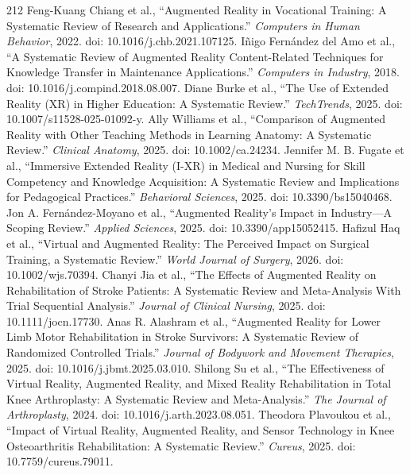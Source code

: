 \begin{thebibliography}{212}
 Feng-Kuang Chiang et al., ``Augmented Reality in Vocational Training: A Systematic Review of Research and Applications.'' \emph{Computers in Human Behavior}, 2022. doi: 10.1016/j.chb.2021.107125.
 I{\~n}igo Fern{\'a}ndez del Amo et al., ``A Systematic Review of Augmented Reality Content-Related Techniques for Knowledge Transfer in Maintenance Applications.'' \emph{Computers in Industry}, 2018. doi: 10.1016/j.compind.2018.08.007.
 Diane Burke et al., ``The Use of Extended Reality ({XR}) in Higher Education: A Systematic Review.'' \emph{TechTrends}, 2025. doi: 10.1007/s11528-025-01092-y.
 Ally Williams et al., ``Comparison of Augmented Reality with Other Teaching Methods in Learning Anatomy: A Systematic Review.'' \emph{Clinical Anatomy}, 2025. doi: 10.1002/ca.24234.
 Jennifer M. B. Fugate et al., ``Immersive Extended Reality ({I-XR}) in Medical and Nursing for Skill Competency and Knowledge Acquisition: A Systematic Review and Implications for Pedagogical Practices.'' \emph{Behavioral Sciences}, 2025. doi: 10.3390/bs15040468.
 Jon A. Fern{\'a}ndez-Moyano et al., ``Augmented Reality's Impact in Industry---A Scoping Review.'' \emph{Applied Sciences}, 2025. doi: 10.3390/app15052415.
 Hafizul Haq et al., ``Virtual and Augmented Reality: The Perceived Impact on Surgical Training, a Systematic Review.'' \emph{World Journal of Surgery}, 2026. doi: 10.1002/wjs.70394.
 Chanyi Jia et al., ``The Effects of Augmented Reality on Rehabilitation of Stroke Patients: A Systematic Review and Meta-Analysis With Trial Sequential Analysis.'' \emph{Journal of Clinical Nursing}, 2025. doi: 10.1111/jocn.17730.
 Anas R. Alashram et al., ``Augmented Reality for Lower Limb Motor Rehabilitation in Stroke Survivors: A Systematic Review of Randomized Controlled Trials.'' \emph{Journal of Bodywork and Movement Therapies}, 2025. doi: 10.1016/j.jbmt.2025.03.010.
 Shilong Su et al., ``The Effectiveness of Virtual Reality, Augmented Reality, and Mixed Reality Rehabilitation in Total Knee Arthroplasty: A Systematic Review and Meta-Analysis.'' \emph{The Journal of Arthroplasty}, 2024. doi: 10.1016/j.arth.2023.08.051.
 Theodora Plavoukou et al., ``Impact of Virtual Reality, Augmented Reality, and Sensor Technology in Knee Osteoarthritis Rehabilitation: A Systematic Review.'' \emph{Cureus}, 2025. doi: 10.7759/cureus.79011.

\end{thebibliography}
